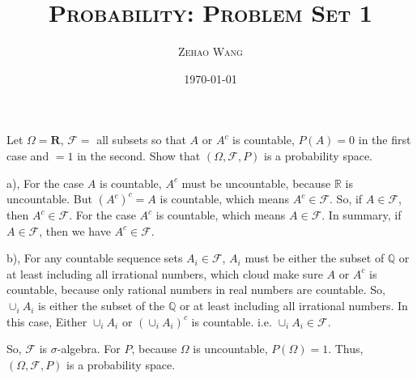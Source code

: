 \documentclass[en, normal, 11pt, black]{elegantnote}
\title{\textsc{Probability: Problem Set 1}}
\author{\textsc{Zehao Wang}}
\date{\today}
\newenvironment{exercise}[1]{\begin{tcolorbox}[colback=black!15, colframe=black!80, breakable, title=#1]}{\end{tcolorbox}}
\renewenvironment{proof}{\begin{tcolorbox}[colback=white, colframe=black!50, breakable, title=Proof. ]\setlength{\parskip}{0.8em}}{\\\rightline{$\square$}\end{tcolorbox}}
\begin{document}
\maketitle
    \begin{exercise}{1.1.1}
        Let $\Omega=\mathbf{R}$, $\mathcal{F}=$ all subsets so that $A$ or $A^c$ is countable, $P(A) = 0$ in the first case and $= 1$ in the second. Show that $(\Omega,\mathcal{F},P)$ is a probability space. 
    \end{exercise}
    \begin{proof}
        a), For the case $A$ is countable, $A^c$ must be uncountable, because $\mathbb{R}$ is uncountable. But $(A^c)^c=A$ is countable, which means $A^c\in\mathcal{F}$. So, if $A\in\mathcal{F}$, then $A^c\in\mathcal{F}$. For the case $A^c$ is countable, which means $A\in\mathcal{F}$. In summary, if $A\in\mathcal{F}$, then we have $A^c\in\mathcal{F}$. 

        b), For any countable sequence sets $A_i\in\mathcal{F}$, $A_i$ must be either the subset of $\mathbb{Q}$ or at least including all irrational numbers, which cloud make sure $A$ or $A^c$ is countable, because only rational numbers in real numbers are countable. So, $\cup_iA_i$ is either the subset of the $\mathbb{Q}$ or at least including all irrational numbers. In this case, Either $\cup_iA_i$ or $(\cup_iA_i)^c$ is countable. i.e. $\cup_iA_i\in\mathcal{F}$. 

        So, $\mathcal{F}$ is $\sigma$-algebra. For $P$, because $\Omega$ is uncountable, $P(\Omega)=1$. Thus, $(\Omega,\mathcal{F},P)$ is a probability space. 
    \end{proof}
    
\end{document}
